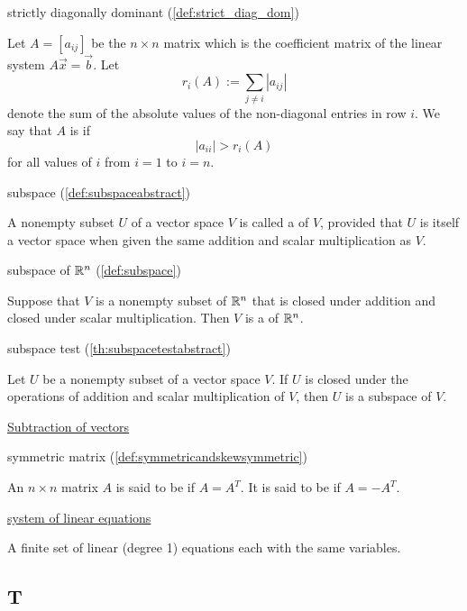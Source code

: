 \documentclass{ximera}
\begin{document}
strictly diagonally dominant (\ref{def:strict_diag_dom})
\begin{expandable}
    Let $A=[a_{ij}]$ be the $n\times n$ matrix which is the coefficient matrix of the linear system $A \vec{x}= \vec{b}$.  Let
$$
r_i(A):= \sum_{j \ne i} |a_{ij}|
$$
denote the sum of the absolute values of the non-diagonal entries in row $i$.  We say that $A$ is  if 
$$|a_{ii}|>r_i(A)$$
for all values of $i$ from $i=1$ to $i=n$.
\end{expandable}


subspace (\ref{def:subspaceabstract})
\begin{expandable}
    A nonempty subset $U$ of a vector space $V$ is called a  of $V$, provided that $U$ is itself a vector space when given the same addition and scalar multiplication as $V$.
\end{expandable}

subspace of $\mathbb{R}^n$ (\ref{def:subspace})
\begin{expandable}
    Suppose that $V$ is a nonempty subset of $\mathbb{R}^n$ that is closed under addition and closed under scalar multiplication.  Then $V$ is a  of $\mathbb{R}^n$.
\end{expandable}

subspace test (\ref{th:subspacetestabstract})
\begin{expandable}
    Let $U$ be a nonempty subset of a vector space $V$.  If $U$ is closed under the operations of addition and scalar multiplication of $V$, then $U$ is a subspace of $V$.
\end{expandable}

\href{https://ximera.osu.edu/oerlinalg/LinearAlgebra/VEC-0030/main}{Subtraction of vectors}

symmetric matrix (\ref{def:symmetricandskewsymmetric})
\begin{expandable}
    An $n\times n$ matrix $A$ is said to be
 if $A=A^{T}.$ It is said to be
 if $A=-A^{T}.$
\end{expandable}

\href{https://ximera.osu.edu/oerlinalg/LinearAlgebra/SYS-0010/main}{system of linear equations}
\begin{expandable}
    A finite set of linear (degree 1) equations each with the same variables.
\end{expandable}


\subsection*{T}
\end{document}
